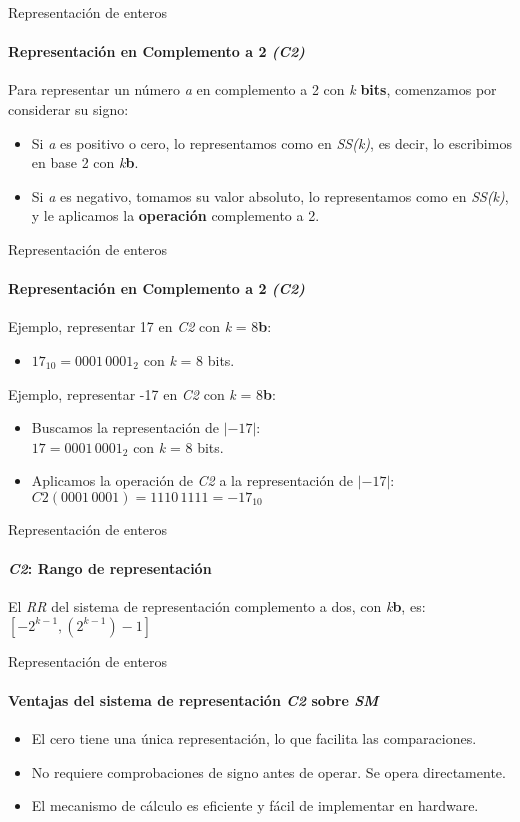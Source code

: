 \documentclass[11pt,a4paper,spanish]{beamer}
\newcommand{\bit}{\textbf{b}}
\begin{document}
\begin{frame}{Representación de enteros}
    \framesubtitle{Representación en Complemento a 2 \emph{(C2)}}

    Para representar un número \textit{a} en complemento a 2 con \emph{k}
    \textbf{bits}, comenzamos por considerar su signo:
    \begin{itemize}
    \pause
    \item Si \textit{a} es positivo o cero, lo representamos como en
        \emph{SS(k)}, es decir, lo escribimos en base 2 con \emph{k}\bit{}.
    \item Si \textit{a} es negativo, tomamos su valor absoluto, lo
        representamos como en \emph{SS(k)}, y le aplicamos la
            \textbf{operación} complemento a 2. 
\end{itemize}
\end{frame}

\begin{frame}{Representación de enteros}
    \framesubtitle{Representación en Complemento a 2 \emph{(C2)}}
    Ejemplo, representar 17 en \emph{C2} con \emph{k} = 8\bit{}:
    \pause
    \begin{itemize}
        \item $17_{10} = 0001\,0001_{2}$ con \textit{k} = 8 bits.
    \end{itemize}
    \pause
    Ejemplo, representar -17 en \emph{C2} con \emph{k} = 8\bit{}:
    \pause
    \begin{itemize}
        \item Buscamos la representación de $|-17|$:\\
        $17 = 0001\,0001_{2}$ con \textit{k} = 8 bits.
    \pause
        \item Aplicamos la operación de \emph{C2} a la representación de
            $|-17|$:\\
            $C2(0001\,0001) = 1110\,1111 = -17_{10}$
    \end{itemize}
\end{frame}

\begin{frame}{Representación de enteros}
    \framesubtitle{\emph{C2}: Rango de representación}
    El \emph{RR} del sistema de representación complemento a dos, con
    \emph{k}\bit{}, es:  $[-2^{k-1},(2^{k-1})-1]$ 
\end{frame}


\begin{frame}{Representación de enteros}
    \framesubtitle{Ventajas del sistema de representación \emph{C2} sobre
    \emph{SM}}

    \begin{itemize}
        \item El cero tiene una única representación, lo que facilita las
            comparaciones.
        \item No requiere comprobaciones de signo antes de operar. Se opera
            directamente.
        \item El mecanismo de cálculo es eficiente y fácil de implementar en
            hardware.
    \end{itemize}
\end{frame}
\end{document}
